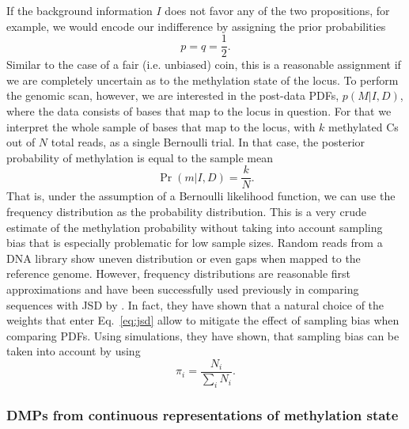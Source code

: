 \documentclass[a4paper]{article}
\begin{document}
If the background information $I$ does not favor any of the two
propositions, for example, we would encode our indifference by
assigning the prior probabilities
\begin{equation}
p = q = \frac{1}{2}.
\end{equation}
Similar to the case of a fair (i.e. unbiased) coin, this is a
reasonable assignment if we are completely uncertain as to the
methylation state of the locus. To perform the genomic scan, however,
we are interested in the post-data PDFs, $p(M|I,D)$, where the data
consists of bases that map to the locus in question. For that we
interpret the whole sample of bases that map to the locus, with $k$
methylated Cs out of $N$ total reads, as a single Bernoulli trial. In
that case, the posterior probability of methylation is equal to the
sample mean
\begin{equation}
\Pr(m|I,D) = \frac{k}{N}.
\end{equation} 
That is, under the assumption of a Bernoulli likelihood function, we
can use the frequency distribution as the probability distribution.
This is a very crude estimate of the methylation probability without
taking into account sampling bias that is especially problematic for
low sample sizes. Random reads from a DNA library show uneven
distribution or even gaps when mapped to the reference genome.
However, frequency distributions are reasonable first approximations
and have been successfully used previously in comparing sequences with
JSD by \cite{grosse2002}. In fact, they have shown that a natural
choice of the weights that enter Eq.~\ref{eq:jsd} allow to mitigate
the effect of sampling bias when comparing PDFs. Using simulations,
they have shown, that sampling bias can be taken into account by using
\begin{equation}
\pi_{i} = \frac{N_{i}}{\sum_i N_{i}}.
\end{equation}

\subsubsection{DMPs from continuous representations of methylation state}
\label{sec:dmp-continuous}
\end{document}
